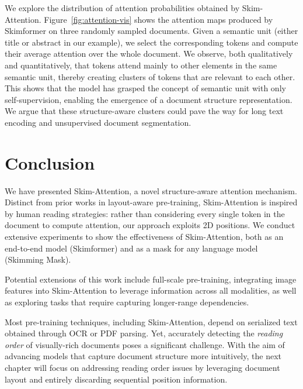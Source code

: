 
We explore the distribution of attention probabilities obtained by Skim-Attention. Figure~\ref{fig:attention-vis} shows the attention maps produced by Skimformer on three  randomly sampled documents. Given a semantic unit (either title or abstract in our example), we select the corresponding tokens and compute their average attention over the whole document. We observe, both qualitatively and quantitatively, that tokens attend mainly to other elements in the same semantic unit, thereby creating clusters of tokens that are relevant to each other. This shows that the model has grasped the concept of semantic unit with only self-supervision, enabling the emergence of a document structure representation. We argue that these structure-aware clusters could pave the way for long text encoding and unsupervised document segmentation.

\section{Conclusion}

We have presented Skim-Attention, a novel structure-aware attention mechanism. Distinct from prior works in layout-aware pre-training, Skim-Attention is inspired by human reading strategies: rather than considering every single token in the document to compute attention, our approach exploits 2D positions. We conduct extensive experiments to show the effectiveness of Skim-Attention, both as an end-to-end model (Skimformer) and as a mask for any language model (Skimming Mask). 

Potential extensions of this work include full-scale pre-training, integrating image features into Skim-Attention to leverage information across all modalities, as well as exploring tasks that require capturing longer-range dependencies.

Most pre-training techniques, including Skim-Attention, depend on serialized text obtained through \ac{OCR} or PDF parsing. Yet, accurately detecting the \textit{reading order} of visually-rich documents poses a significant challenge. With the aim of advancing models that capture document structure more intuitively, the next chapter will focus on addressing reading order issues by leveraging document layout and entirely discarding sequential position information.


